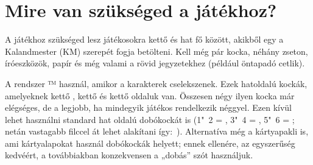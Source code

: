 \section{Mire van szükséged a játékhoz?}

A  játékhoz szükséged lesz játékosokra kettő és hat fő között, akikből egy a Kalandmester (KM) szerepét fogja betölteni. Kell még pár kocka, néhány zseton, íróeszközök, papír és még valami a rövid jegyzetekhez (például öntapadó cetlik).

A  rendszer ™ használ, amikor a karakterek cselekszenek. Ezek hatoldalú kockák, amelyeknek kettő , kettő \dice{+} és kettő \dice{-} oldaluk van. Összesen négy ilyen kocka már elégséges, de a legjobb, ha mindegyik játékos rendelkezik néggyel. Ezen kívül lehet használni standard hat oldalú dobókockát is (1"~2 = \dice{-}, 3"~4 = , 5"~6 = \dice{+}; netán vastagabb filccel át lehet alakítani így:~). Alternatíva még a  kártyapakli is, ami kártyalapokat használ dobókockák helyett; ennek ellenére, az egyszerűség kedvéért, a továbbiakban konzekvensen a „dobás” szót használjuk.
